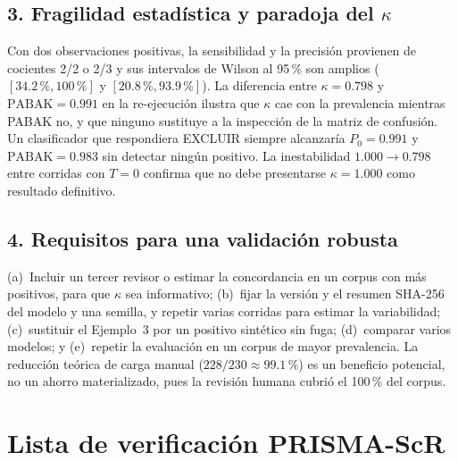 \subsection*{3. Fragilidad estadística y paradoja del $\kappa$}

Con dos observaciones positivas, la sensibilidad y la precisión provienen
de cocientes 2/2 o 2/3 y sus intervalos de Wilson al 95\,\% son amplios
($[34.2\,\%,100\,\%]$ y $[20.8\,\%,93.9\,\%]$). La diferencia entre
$\kappa=0.798$ y $\text{PABAK}=0.991$ en la re-ejecución ilustra que
$\kappa$ cae con la prevalencia mientras PABAK no, y que ninguno
sustituye a la inspección de la matriz de confusión. Un clasificador
que respondiera EXCLUIR siempre alcanzaría $P_0=0.991$ y
$\text{PABAK}=0.983$ sin detectar ningún positivo. La inestabilidad
$1.000\to0.798$ entre corridas con $T=0$ confirma que no debe presentarse
$\kappa=1.000$ como resultado definitivo.

\subsection*{4. Requisitos para una validación robusta}

(a)~Incluir un tercer revisor o estimar la concordancia en un corpus
con más positivos, para que $\kappa$ sea informativo; (b)~fijar la versión
y el resumen SHA-256 del modelo y una semilla, y repetir varias corridas
para estimar la variabilidad; (c)~sustituir el Ejemplo~3 por un positivo
sintético sin fuga; (d)~comparar varios modelos; y (e)~repetir la
evaluación en un corpus de mayor prevalencia. La reducción teórica de
carga manual ($228/230\approx 99.1\,\%$) es un beneficio potencial, no un
ahorro materializado, pues la revisión humana cubrió el 100\,\% del
corpus.

\section{Lista de verificación PRISMA-ScR}
\label{apx:prisma}

